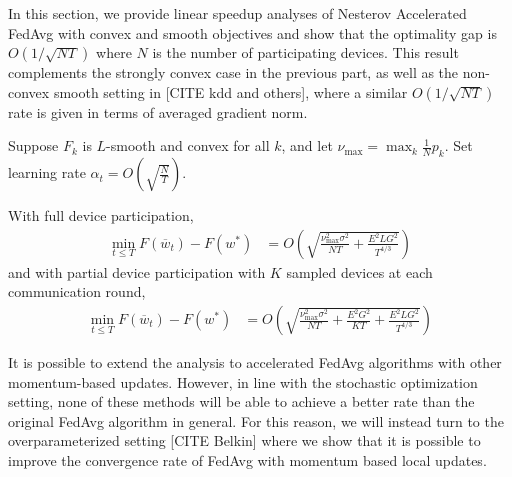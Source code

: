 In this section, we provide linear speedup analyses of Nesterov Accelerated
FedAvg with convex and smooth objectives and show that the optimality
gap is $O(1/\sqrt{NT})$ where $N$ is the number of participating
devices. This result complements the strongly convex case in the previous
part, as well as the non-convex smooth setting in {[}CITE kdd and
others{]}, where a similar $O(1/\sqrt{NT})$ rate is given in terms
of averaged gradient norm. 
\begin{theorem}
	Suppose $F_{k}$ is $L$-smooth and convex for all $k$, and let $\nu_{\max}=\max_{k}\frac{1}{N}p_{k}$.
	Set learning rate $\alpha_{t}=O(\sqrt{\frac{N}{T}})$.
	
	With full device participation, 
	\begin{align*}
	\min_{t\leq T}F(\overline{w}_{t})-F(w^{\ast}) & =O(\sqrt{\frac{\nu_{\max}^{2}\sigma^{2}}{NT}+\frac{E^{2}LG^{2}}{T^{4/3}}})
	\end{align*}
	and with partial device participation with $K$ sampled devices at
	each communication round, 
	\begin{align*}
	\min_{t\leq T}F(\overline{w}_{t})-F(w^{\ast}) & =O(\sqrt{\frac{\nu_{\max}^{2}\sigma^{2}}{NT}+\frac{E^{2}G^{2}}{KT}+\frac{E^{2}LG^{2}}{T^{4/3}}})
	\end{align*}
\end{theorem}
%
\begin{remark}
	It is possible to extend the analysis to accelerated FedAvg algorithms
	with other momentum-based updates. However, in line with the stochastic
	optimization setting, none of these methods will be able to achieve
	a better rate than the original FedAvg algorithm in general. For this
	reason, we will instead turn to the overparameterized setting {[}CITE
	Belkin{]} where we show that it is possible to improve the convergence
	rate of FedAvg with momentum based local updates. 
\end{remark}